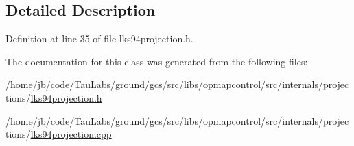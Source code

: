 \subsection{\-Detailed \-Description}


\-Definition at line 35 of file lks94projection.\-h.



\-The documentation for this class was generated from the following files\-:\begin{DoxyCompactItemize}
\item 
/home/jb/code/\-Tau\-Labs/ground/gcs/src/libs/opmapcontrol/src/internals/projections/\hyperlink{lks94projection_8h}{lks94projection.\-h}\item 
/home/jb/code/\-Tau\-Labs/ground/gcs/src/libs/opmapcontrol/src/internals/projections/\hyperlink{lks94projection_8cpp}{lks94projection.\-cpp}\end{DoxyCompactItemize}
